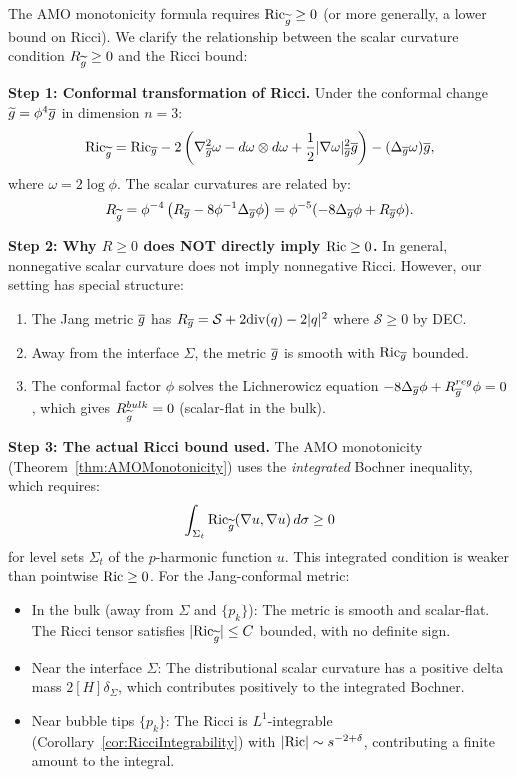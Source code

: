 \begin{remark}\label{rem:RicciFromScalar}
The AMO monotonicity formula requires $\mathrm{Ric}_{\widetilde{g}} \ge 0$ (or more generally, a lower bound on Ricci). We clarify the relationship between the scalar curvature condition $R_{\widetilde{g}} \ge 0$ and the Ricci bound:

\textbf{Step 1: Conformal transformation of Ricci.} Under the conformal change $\widetilde{g} = \phi^4 \overline{g}$ in dimension $n=3$:
\begin{equation}
    \mathrm{Ric}_{\widetilde{g}} = \mathrm{Ric}_{\overline{g}} - 2\left(\nabla^2_{\overline{g}}\omega - d\omega \otimes d\omega + \frac{1}{2}|\nabla\omega|^2_{\overline{g}} \overline{g}\right) - (\Delta_{\overline{g}}\omega) \overline{g},
\end{equation}
where $\omega = 2\log\phi$. The scalar curvatures are related by:
\begin{equation}
    R_{\widetilde{g}} = \phi^{-4}\left(R_{\overline{g}} - 8\phi^{-1}\Delta_{\overline{g}}\phi\right) = \phi^{-5}(-8\Delta_{\overline{g}}\phi + R_{\overline{g}}\phi).
\end{equation}

\textbf{Step 2: Why $R \ge 0$ does NOT directly imply $\mathrm{Ric} \ge 0$.} In general, nonnegative scalar curvature does not imply nonnegative Ricci. However, our setting has special structure:
\begin{enumerate}
    \item[(a)] The Jang metric $\overline{g}$ has $R_{\overline{g}} = \mathcal{S} + 2\mathrm{div}(q) - 2|q|^2$ where $\mathcal{S} \ge 0$ by DEC.
    \item[(b)] Away from the interface $\Sigma$, the metric $\overline{g}$ is smooth with $\mathrm{Ric}_{\overline{g}}$ bounded.
    \item[(c)] The conformal factor $\phi$ solves the Lichnerowicz equation $-8\Delta_{\overline{g}}\phi + R_{\overline{g}}^{reg}\phi = 0$, which gives $R_{\widetilde{g}}^{bulk} = 0$ (scalar-flat in the bulk).
\end{enumerate}

\textbf{Step 3: The actual Ricci bound used.} The AMO monotonicity (Theorem~\ref{thm:AMOMonotonicity}) uses the \emph{integrated} Bochner inequality, which requires:
\begin{equation}
    \int_{\Sigma_t} \mathrm{Ric}_{\widetilde{g}}(\nabla u, \nabla u) \, d\sigma \ge 0
\end{equation}
for level sets $\Sigma_t$ of the $p$-harmonic function $u$. This integrated condition is weaker than pointwise $\mathrm{Ric} \ge 0$. For the Jang-conformal metric:
\begin{itemize}
    \item In the bulk (away from $\Sigma$ and $\{p_k\}$): The metric is smooth and scalar-flat. The Ricci tensor satisfies $|\mathrm{Ric}_{\widetilde{g}}| \le C$ bounded, with no definite sign.
    \item Near the interface $\Sigma$: The distributional scalar curvature has a positive delta mass $2[H]\delta_\Sigma$, which contributes positively to the integrated Bochner.
    \item Near bubble tips $\{p_k\}$: The Ricci is $L^1$-integrable (Corollary~\ref{cor:RicciIntegrability}) with $|\mathrm{Ric}| \sim s^{-2+\delta}$, contributing a finite amount to the integral.
\end{itemize}


\end{remark}
